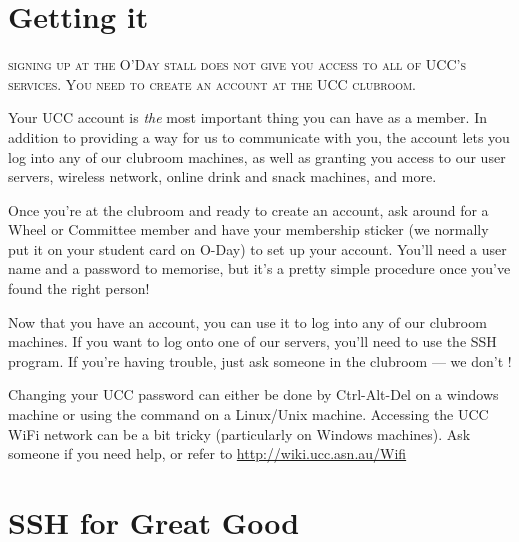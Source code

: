 \label{SetupAccount}


\section{Getting it}

\begin{mdframed}

\textsc{signing up at the O'Day stall does not give you access to all of UCC's services. You need to create an account at the UCC clubroom.}

Your UCC account is \emph{the} most important thing you can have as a member. In addition to providing a way for us to communicate with you, the account lets you log into any of our clubroom machines, as well as granting you access to our user servers, wireless network, online drink and snack machines, and more.

Once you're at the clubroom and ready to create an account, ask around for a Wheel or Committee member and have your membership sticker (we normally put it on your student card on O-Day) to set up your account. You'll need a user name and a password to memorise, but it's a pretty simple procedure once you've found the right person!


Now that you have an account, you can use it to log into any of our clubroom machines. If you want to log onto one of our servers, you'll need to use the SSH program. If you're having trouble, just ask someone in the clubroom --- we don't !

Changing your UCC password can either be done by Ctrl-Alt-Del on a windows machine or using the command  on a Linux/Unix machine.
Accessing the UCC WiFi network can be a bit tricky (particularly on Windows machines). Ask someone if you need help, or refer to \url{http://wiki.ucc.asn.au/Wifi}

\end{mdframed}

\pagebreak

\section{SSH for Great Good}

